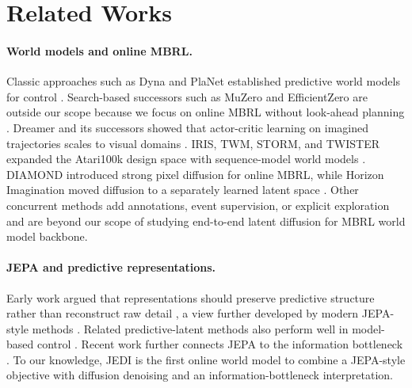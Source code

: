 \documentclass{article}
\begin{document}
\section{Related Works}
\label{sec:related}
\paragraph{World models and online MBRL.}
Classic approaches such as Dyna and PlaNet established predictive world models for control \citep{sutton1991DYNA,hafner2019Planet}. Search-based successors such as MuZero and EfficientZero are outside our scope because we focus on online MBRL without look-ahead planning \citep{silver2017MuZero,muzero2020,EfficientZero}. Dreamer and its successors showed that actor-critic learning on imagined trajectories scales to visual domains \citep{Hafner2020Dreamer,hafner2020Dreamerv2,hafner2023Dreamerv3}. IRIS, TWM, STORM, and TWISTER expanded the Atari100k design space with sequence-model world models \citep{micheli2022iris,robine2023TWM,zhang2023storm,TWISTER}. DIAMOND introduced strong pixel diffusion for online MBRL, while Horizon Imagination moved diffusion to a separately learned latent space \citep{alonso2024diamond,cohen2026horizonImagination}. Other concurrent methods add annotations, event supervision, or explicit exploration \citep{OC-STORM,EA-SIMULUS,SIMULUS} and are beyond our scope of studying end-to-end latent diffusion for MBRL world model backbone.
\paragraph{JEPA and predictive representations.}
Early work argued that representations should preserve predictive structure rather than reconstruct raw detail \citep{PMAX}, a view further developed by modern JEPA-style methods \citep{grill2020BYOL,caron2021DINO,assran2023I-JEPA,bardes2024vjepa,assran2025VJEPA2}. Related predictive-latent methods also perform well in model-based control \citep{hansen2022TDMPC,hansen2023tdmpc2,maes2026leworldmodel,wang2026temporalstraightening}. Recent work further connects JEPA to the information bottleneck \citep{tishby2000InfoBottleneck,alemi2016deepVarIB,shwartz2017opening,2023multiviewJepa,shwartz2023informationVICREG,shwartz2024compress}. To our knowledge, JEDI is the first online world model to combine a JEPA-style objective with diffusion denoising and an information-bottleneck interpretation.
\end{document}
